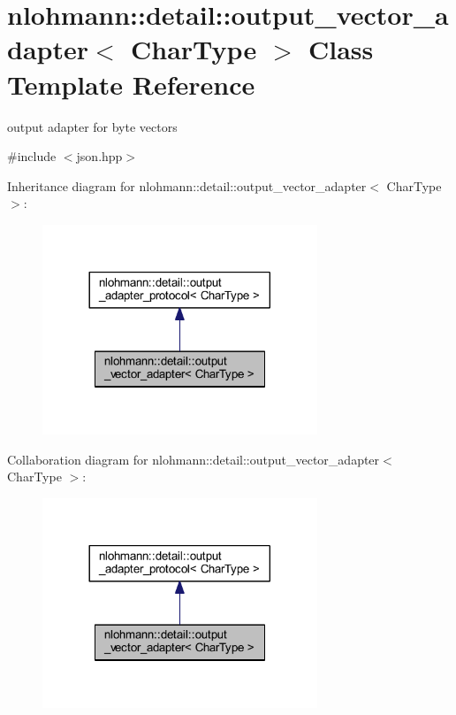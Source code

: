 \hypertarget{classnlohmann_1_1detail_1_1output__vector__adapter}{}\section{nlohmann\+::detail\+::output\+\_\+vector\+\_\+adapter$<$ Char\+Type $>$ Class Template Reference}
\label{classnlohmann_1_1detail_1_1output__vector__adapter}


output adapter for byte vectors  




{\ttfamily \#include $<$json.\+hpp$>$}



Inheritance diagram for nlohmann\+::detail\+::output\+\_\+vector\+\_\+adapter$<$ Char\+Type $>$\+:
\nopagebreak
\begin{figure}[H]
\begin{center}
\leavevmode
\includegraphics[width=233pt]{classnlohmann_1_1detail_1_1output__vector__adapter__inherit__graph}
\end{center}
\end{figure}


Collaboration diagram for nlohmann\+::detail\+::output\+\_\+vector\+\_\+adapter$<$ Char\+Type $>$\+:
\nopagebreak
\begin{figure}[H]
\begin{center}
\leavevmode
\includegraphics[width=233pt]{classnlohmann_1_1detail_1_1output__vector__adapter__coll__graph}
\end{center}
\end{figure}
